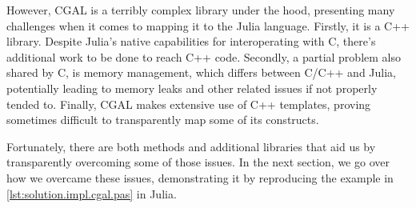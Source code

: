 However, \ac{CGAL} is a terribly complex library under the hood, presenting many
challenges when it comes to mapping it to the Julia language.  Firstly, it is
a C++ library.  Despite Julia's native capabilities for interoperating with C,
there's additional work to be done to reach C++ code.  Secondly, a partial
problem also shared by C, is memory management, which differs between C/C++ and
Julia, potentially leading to memory leaks and other related issues if not
properly tended to.  Finally, \ac{CGAL} makes extensive use of C++ templates,
proving sometimes difficult to transparently map some of its constructs.

Fortunately, there are both methods and additional libraries that aid us by
transparently overcoming some of those issues.  In the next section, we go over
how we overcame these issues, demonstrating it by reproducing the example in
\cref{lst:solution.impl.cgal.pas} in Julia.
